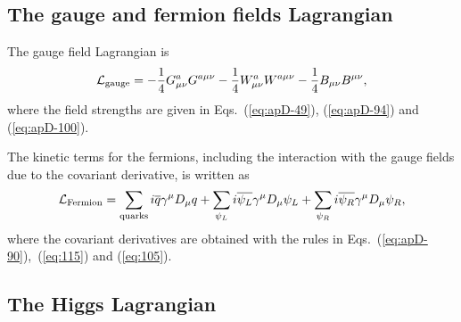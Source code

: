 \documentclass{ws-ijmpa}
\begin{document}
\subsection{The gauge and fermion fields Lagrangian}

The gauge field Lagrangian is
%
\begin{equation}
  \label{eq:113}
  \mathcal{L}_{\rm gauge} = -\frac{1}{4} G_{\mu\nu}^a G^{a \mu\nu}
-\frac{1}{4} W_{\mu\nu}^a W^{a \mu\nu}
-\frac{1}{4} B_{\mu\nu} B^{\mu\nu},
\end{equation}
%
where the field strengths are given in
Eqs.~(\ref{eq:apD-49}), (\ref{eq:apD-94}) and (\ref{eq:apD-100}).

The kinetic terms for the fermions,
including the interaction with the gauge fields due to the covariant derivative,
is written as
%
\begin{equation}
  \label{eq:114}
  \mathcal{L}_{\rm Fermion} =  
\sum_{\rm quarks} i \overline{q} \gamma^\mu D_\mu q 
+ \sum_{\psi_L} i \overline{\psi_L} \gamma^\mu  D_\mu \psi_L
+ \sum_{\psi_R} i \overline{\psi_R} \gamma^\mu  D_\mu \psi_R,
\end{equation}
%
where the covariant derivatives are obtained with the rules in
Eqs.~(\ref{eq:apD-90}),~(\ref{eq:115}) and (\ref{eq:105}).



\subsection{The Higgs Lagrangian}
\end{document}
